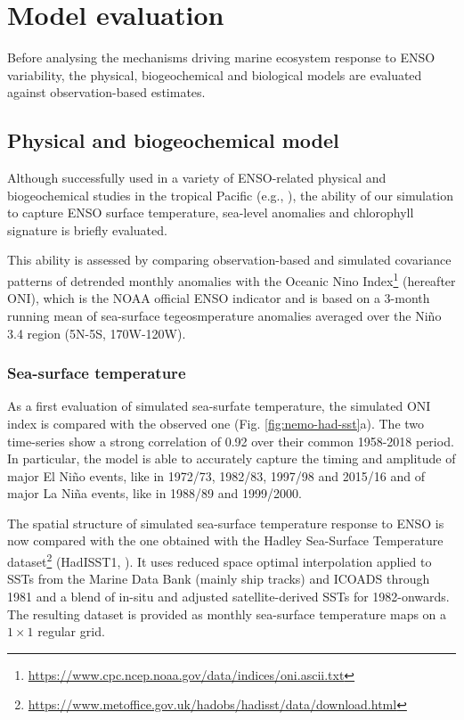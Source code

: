 \section{Model evaluation}

Before analysing the mechanisms driving marine ecosystem response to ENSO variability, the physical, biogeochemical and biological models are evaluated against observation-based estimates.

\subsection{Physical and biogeochemical model}

Although successfully used in a variety of ENSO-related physical and biogeochemical studies in the tropical Pacific (e.g., \citealt{vialardModelStudyOceanic2001, lengaigneOceanResponseMarch2002, lengaigneInfluenceOceanicBiology2007, schneiderClimateinducedInterannualVariability2008, masottiLargescaleShiftsPhytoplankton2011, currieIndianOceanDipole2013}), the ability of our simulation to capture ENSO surface temperature, sea-level anomalies and chlorophyll signature is briefly evaluated. 

This ability is assessed by comparing observation-based and simulated covariance patterns of detrended monthly anomalies with the Oceanic Nino Index\footnote{\url{https://www.cpc.ncep.noaa.gov/data/indices/oni.ascii.txt}} (hereafter ONI), which is the NOAA official ENSO indicator and is based on a 3-month running mean of sea-surface tegeosmperature anomalies averaged over the Niño 3.4 region (5N-5S, 170W-120W).

\subsubsection{Sea-surface temperature}
\label{sec:sst}

As a first evaluation of simulated sea-surfate temperature, the simulated ONI index is compared with the observed one (Fig. \ref{fig:nemo-had-sst}a). The two time-series show a strong correlation of 0.92 over their common 1958-2018 period. In particular, the model is able to accurately capture the timing and amplitude of major El Niño events, like in 1972/73, 1982/83, 1997/98 and 2015/16 and of major La Niña events, like in 1988/89 and 1999/2000. 

The spatial structure of simulated sea-surface temperature response to ENSO is now compared with the one obtained with the Hadley Sea-Surface Temperature dataset\footnote{\url{https://www.metoffice.gov.uk/hadobs/hadisst/data/download.html}} (HadISST1, \citealt{raynerGlobalAnalysesSea2003}). It uses reduced space optimal interpolation applied to SSTs from the Marine Data Bank (mainly ship tracks) and ICOADS through 1981 and a blend of in-situ and adjusted satellite-derived SSTs for 1982-onwards. The resulting dataset is provided as monthly sea-surface temperature maps on a $1\times 1$ regular grid. 

